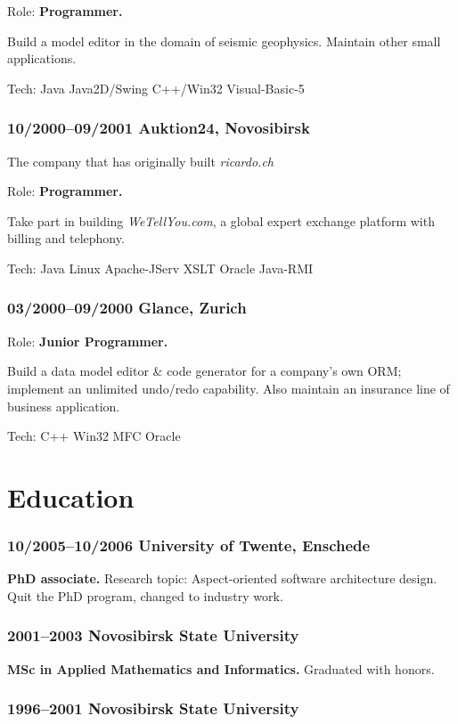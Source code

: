 \documentclass[a4paper, twocolumn, 10pt]{article}
\begin{document}
Role: \textbf{Programmer.}

Build a model editor in the domain of seismic geophysics. Maintain other small applications.

Tech: Java Java2D/Swing C++/Win32 Visual-Basic-5

\subsubsection*{10/2000--09/2001 Auktion24, Novosibirsk}

The company that has originally built \emph{ricardo.ch}

Role: \textbf{Programmer.}

Take part in building \emph{WeTellYou.com}, a global expert exchange platform with billing and telephony.

Tech: Java Linux Apache-JServ XSLT Oracle Java-RMI

\subsubsection*{03/2000--09/2000 Glance, Zurich}

Role: \textbf{Junior Programmer.}

Build a data model editor \& code generator for a company's own ORM; implement an unlimited
undo/redo capability. Also maintain an insurance line of business application.

Tech: C++ Win32 MFC Oracle

\section*{Education}

\subsubsection*{10/2005--10/2006 University of Twente, Enschede}

\textbf{PhD associate.} Research topic: Aspect-oriented software architecture design. Quit the PhD
program, changed to industry work.

\subsubsection*{2001--2003 Novosibirsk State University}

\textbf{MSc in Applied Mathematics and Informatics.} Graduated with honors.

\subsubsection*{1996--2001 Novosibirsk State University}
\end{document}

